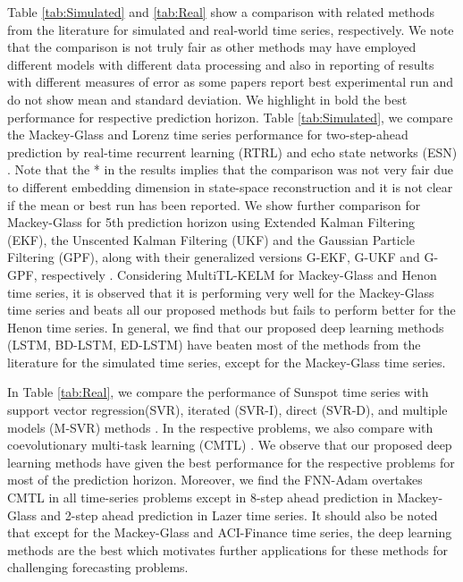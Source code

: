 \documentclass[final,5p,times,twocolumn]{elsarticle}
\begin{document}
  
 
 Table \ref{tab:Simulated} and \ref{tab:Real} show  a comparison with related methods from the 
literature for simulated and real-world time series, respectively. We 
note that the comparison is not truly fair as other 
methods may have employed different models with different 
  data processing and also in reporting of results with 
different measures of error as some papers report best experimental run and do not show mean and standard deviation. We highlight in bold the best performance for respective prediction horizon. Table \ref{tab:Simulated}, we compare the Mackey-Glass and Lorenz time series 
performance for  two-step-ahead prediction by real-time recurrent 
learning (RTRL) and  echo state networks (ESN) \cite{chang2012reinforced}. Note 
that the * in  the results  implies  that the comparison 
was not very fair due to  different embedding 
dimension in state-space reconstruction  and it is not clear if the mean or best run has been 
reported. We show further comparison for Mackey-Glass for 5th prediction horizon 
using Extended Kalman Filtering (EKF), the Unscented Kalman Filtering (UKF) and 
the
 Gaussian Particle Filtering (GPF),  along with their    generalized   
versions G-EKF, G-UKF
 and G-GPF, respectively \cite{Wu2013AMC}. Considering MultiTL-KELM \cite{YE2019227}   for Mackey-Glass and Henon time series, it is observed that it is performing very well for the Mackey-Glass time series and beats all our proposed methods but fails to perform better for the Henon time series.  In general, we find that our proposed deep learning methods (LSTM, BD-LSTM, ED-LSTM) have beaten most of the methods from the literature for the simulated time series, except for the Mackey-Glass time series. 
 
In Table  \ref{tab:Real}, we compare the performance of Sunspot  time series  with support vector 
regression(SVR),  iterated (SVR-I), direct (SVR-D), and  multiple models
(M-SVR) methods \cite{zhang2013iterated}. In the respective problems, we also compare with   coevolutionary multi-task learning (CMTL) \cite{chandra2017CMTLMulti}.   We observe that  our proposed deep learning methods have given the best performance for the respective problems for most of the prediction horizon. Moreover, we find  the FNN-Adam overtakes  CMTL in all time-series problems except in 8-step ahead prediction in Mackey-Glass and 2-step ahead prediction in Lazer time series. It should also be noted that except for the Mackey-Glass and ACI-Finance time series, the deep learning methods are the best  which motivates further applications for these methods for challenging forecasting problems. 
 
\end{document}
